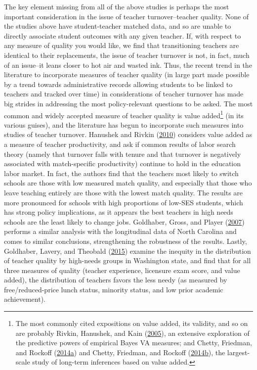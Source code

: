 \documentclass[12pt,]{article}
\let\rmarkdownfootnote\footnote%
\def\footnote{\protect\rmarkdownfootnote}
\begin{document}
The key element missing from all of the above studies is perhaps the
most important consideration in the issue of teacher turnover--teacher
quality. None of the studies above have student-teacher matched data,
and so are unable to directly associate student outcomes with any given
teacher. If, with respect to any measure of quality you would like, we
find that transitioning teachers are identical to their replacements,
the issue of teacher turnover is not, in fact, much of an issue--it
leans closer to hot air and wasted ink. Thus, the recent trend in the
literature to incorporate measures of teacher quality (in large part
made possible by a trend towards administrative records allowing
students to be linked to teachers and tracked over time) in
considerations of teacher turnover has made big strides in addressing
the most policy-relevant questions to be asked. The most common and
widely accepted measure of teacher quality is value added\footnote{The
  most commonly cited expositions on value added, its validity, and so
  on are probably Rivkin, Hanushek, and Kain
  (\protect\hyperlink{ref-rivkin}{2005}), an extensive exploration of
  the predictive powers of empirical Bayes VA measures; and Chetty,
  Friedman, and Rockoff
  (\protect\hyperlink{ref-chettyI}{2014}\protect\hyperlink{ref-chettyI}{a})
  and Chetty, Friedman, and Rockoff
  (\protect\hyperlink{ref-chettyII}{2014}\protect\hyperlink{ref-chettyII}{b}),
  the largest-scale study of long-term inferences based on value added.}
(in its various guises), and the literature has begun to incorporate
such measures into studies of teacher turnover. Hanushek and Rivkin
(\protect\hyperlink{ref-hanushek2010}{2010}) considers value added as a
measure of teacher productivity, and ask if common results of labor
search theory (namely that turnover falls with tenure and that turnover
is negatively associated with match-specific productivity) continue to
hold in the education labor market. In fact, the authors find that the
teachers most likely to switch schools are those with low measured match
quality, and especially that those who leave teaching entirely are those
with the lowest match quality. The results are more pronounced for
schools with high proportions of low-SES students, which has strong
policy implications, as it appears the best teachers in high needs
schools are the least likely to change jobs. Goldhaber, Gross, and
Player (\protect\hyperlink{ref-goldhaber2007}{2007}) performs a similar
analysis with the longitudinal data of North Carolina and comes to
similar conclusions, strengthening the robustness of the results.
Lastly, Goldhaber, Lavery, and Theobald
(\protect\hyperlink{ref-goldhaber2015}{2015}) examine the inequity in
the distribution of teacher quality by high-needs groups in Washington
state, and find that for all three measures of quality (teacher
experience, licensure exam score, and value added), the distribution of
teachers favors the less needy (as measured by free/reduced-price lunch
status, minority status, and low prior academic achievement).
\end{document}
